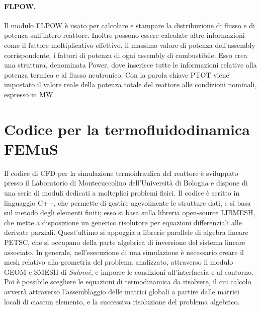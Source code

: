 \paragraph{FLPOW.}
Il modulo FLPOW è usato per calcolare e stampare la distribuzione di flusso e 
di potenza sull'intero reattore.
Inoltre possono essere calcolate altre informazioni come il fattore 
moltiplicativo effettivo, il massimo valore di potenza dell'assembly 
corrispondente, i fattori di potenza di ogni assembly di combustibile.
Esso crea una struttura, denominata Power, dove inserisce tutte le informazioni 
relative alla potenza termica e al flusso neutronico.
Con la parola chiave PTOT viene impostato il valore reale della potenza totale 
del reattore alle condizioni nominali, espresso in MW.




\section{Codice per la termofluidodinamica FEMuS}

Il codice di CFD per la simulazione termoidraulica del reattore è sviluppato 
presso il Laboratorio di Montecuccolino dell'Università di Bologna e dispone di 
una serie di moduli dedicati a molteplici problemi fisici.
Il codice è scritto in linguaggio C++, che permette di gestire agevolmente le 
strutture dati, e si basa sul metodo degli elementi finiti; esso si basa sulla 
libreria open-source LIBMESH, che mette a disposizione un generico risolutore 
per equazioni differenziali alle derivate parziali. Quest'ultimo si appoggia a 
librerie parallele di algebra lineare PETSC, che si occupano della parte 
algebrica di inversione del sistema lineare associato. 
In generale, nell'esecuzione di una simulazione è necessario creare il mesh 
relativo alla geometria del problema analizzato, attraverso il modulo GEOM e 
SMESH di \textit{Salom\'e}, e imporre le condizioni all'interfaccia e al contorno. Poi è 
possibile scegliere le equazioni di termodinamica da risolvere, il cui calcolo 
avverrà attraverso l'assemblaggio delle matrici globali a partire dalle matrici 
locali di ciascun elemento, e la successiva risoluzione del problema algebrico.

